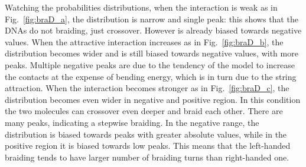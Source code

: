 \documentclass[a4paper,10pt]{article}
\begin{document}
Watching the probabilities distributions, when the interaction is weak as in Fig.~\ref{fig:braD_a}, the distribution is narrow and single peak: this shows that the DNAs do not braiding, just crossover.
However is already biased towards negative values.
When the attractive interaction increases as in Fig.~\ref{fig:braD_b}, the distribution becomes wider and is still biased towards negative values, with more peaks.
Multiple negative peaks are due to the tendency of the model to increase the contacts at the expense of bending energy, which is in turn due to the string attraction.
When the interaction becomes stronger as in Fig.~\ref{fig:braD_c}, the distribution becomes even wider in negative and positive region.
In this condition the two molecules can crossover even deeper and braid each other.
There are many peaks, indicating a stepwise braiding.
In the negative range, the distribution is biased towards peaks with greater absolute values, while in the positive region it is biased towards low peaks.
This means that the left-handed braiding tends to have larger number of braiding turns than right-handed one.
\end{document}

